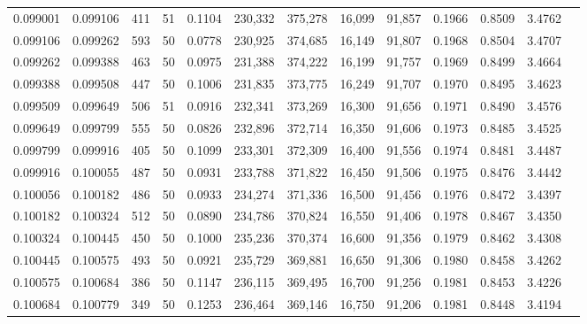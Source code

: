 \begin{tabular}{rrrrrrrrrrrrr}
0.099001 & 0.099106 &   411 &  51 &                                     0.1104 & 230,332 & 375,278 &  16,099 &  91,857 & 0.1966 & 0.8509 & 3.4762 \\
0.099106 & 0.099262 &   593 &  50 &                                     0.0778 & 230,925 & 374,685 &  16,149 &  91,807 & 0.1968 & 0.8504 & 3.4707 \\
0.099262 & 0.099388 &   463 &  50 &                                     0.0975 & 231,388 & 374,222 &  16,199 &  91,757 & 0.1969 & 0.8499 & 3.4664 \\
0.099388 & 0.099508 &   447 &  50 &                                     0.1006 & 231,835 & 373,775 &  16,249 &  91,707 & 0.1970 & 0.8495 & 3.4623 \\
0.099509 & 0.099649 &   506 &  51 &                                     0.0916 & 232,341 & 373,269 &  16,300 &  91,656 & 0.1971 & 0.8490 & 3.4576 \\
0.099649 & 0.099799 &   555 &  50 &                                     0.0826 & 232,896 & 372,714 &  16,350 &  91,606 & 0.1973 & 0.8485 & 3.4525 \\
0.099799 & 0.099916 &   405 &  50 &                                     0.1099 & 233,301 & 372,309 &  16,400 &  91,556 & 0.1974 & 0.8481 & 3.4487 \\
0.099916 & 0.100055 &   487 &  50 &                                     0.0931 & 233,788 & 371,822 &  16,450 &  91,506 & 0.1975 & 0.8476 & 3.4442 \\
0.100056 & 0.100182 &   486 &  50 &                                     0.0933 & 234,274 & 371,336 &  16,500 &  91,456 & 0.1976 & 0.8472 & 3.4397 \\
0.100182 & 0.100324 &   512 &  50 &                                     0.0890 & 234,786 & 370,824 &  16,550 &  91,406 & 0.1978 & 0.8467 & 3.4350 \\
0.100324 & 0.100445 &   450 &  50 &                                     0.1000 & 235,236 & 370,374 &  16,600 &  91,356 & 0.1979 & 0.8462 & 3.4308 \\
0.100445 & 0.100575 &   493 &  50 &                                     0.0921 & 235,729 & 369,881 &  16,650 &  91,306 & 0.1980 & 0.8458 & 3.4262 \\
0.100575 & 0.100684 &   386 &  50 &                                     0.1147 & 236,115 & 369,495 &  16,700 &  91,256 & 0.1981 & 0.8453 & 3.4226 \\
0.100684 & 0.100779 &   349 &  50 &                                     0.1253 & 236,464 & 369,146 &  16,750 &  91,206 & 0.1981 & 0.8448 & 3.4194 \\

\end{tabular}
